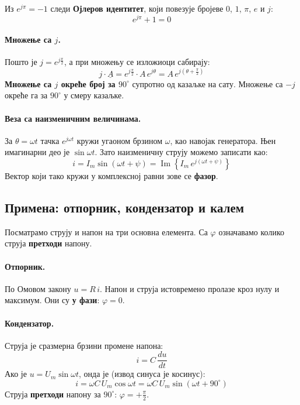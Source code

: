 \documentclass{article}
\begin{document}
Из $e^{j\pi} = -1$ следи \textbf{Ојлеров идентитет}, који повезује бројеве $0$, $1$, $\pi$, $e$ и $j$:
\[
    e^{j\pi} + 1 = 0
\]

\paragraph{Множење са $j$.} Пошто је $j = e^{j\frac{\pi}{2}}$, а при множењу се изложиоци сабирају:
\[
    j\cdot\underline{A} = e^{j\frac{\pi}{2}}\cdot A\,e^{j\theta} = A\,e^{j\left(\theta + \frac{\pi}{2}\right)}
\]
\textbf{Множење са $j$ окреће број за $90^\circ$} супротно од казаљке на сату. Множење са $-j$ окреће га за $90^\circ$ у смеру казаљке.

\paragraph{Веза са наизменичним величинама.} За $\theta = \omega t$ тачка $e^{j\omega t}$ кружи угаоном брзином $\omega$, као навојак генератора. Њен имагинарни део је $\sin\omega t$. Зато наизменичну струју можемо записати као:
\[
    i = I_m\sin(\omega t + \psi) = \operatorname{Im}\left\{ I_m\,e^{j(\omega t + \psi)} \right\}
\]
Вектор који тако кружи у комплексној равни зове се \textbf{фазор}.

\subsection{Примена: отпорник, кондензатор и калем}

Посматрамо струју и напон на три основна елемента. Са $\varphi$ означавамо колико струја \textbf{претходи} напону.

\paragraph{Отпорник.} По Омовом закону $u = R\,i$. Напон и струја истовремено пролазе кроз нулу и максимум. Они су \textbf{у фази}: $\varphi = 0$.

\paragraph{Кондензатор.} Струја је сразмерна брзини промене напона:
\[
    i = C\,\frac{du}{dt}
\]
Ако је $u = U_m\sin\omega t$, онда је (извод синуса је косинус):
\[
    i = \omega C\,U_m\cos\omega t = \omega C\,U_m\sin(\omega t + 90^\circ)
\]
Струја \textbf{претходи} напону за $90^\circ$: $\varphi = +\frac{\pi}{2}$.
\end{document}
